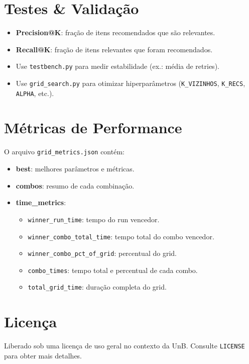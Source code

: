 \documentclass[a4paper,12pt]{article}
\begin{document}
\section*{Testes \& Validação}
\begin{itemize}
  \item \textbf{Precision@K}: fração de itens recomendados que são relevantes.
  \item \textbf{Recall@K}: fração de itens relevantes que foram recomendados.
  \item Use \texttt{testbench.py} para medir estabilidade (ex.: média de retries).
  \item Use \texttt{grid\_search.py} para otimizar hiperparâmetros (\texttt{K\_VIZINHOS}, \texttt{K\_RECS}, \texttt{ALPHA}, etc.).
\end{itemize}

\section*{Métricas de Performance}
O arquivo \texttt{grid\_metrics.json} contém:
\begin{itemize}
  \item \textbf{best}: melhores parâmetros e métricas.
  \item \textbf{combos}: resumo de cada combinação.
  \item \textbf{time\_metrics}: 
    \begin{itemize}
      \item \texttt{winner\_run\_time}: tempo do run vencedor.
      \item \texttt{winner\_combo\_total\_time}: tempo total do combo vencedor.
      \item \texttt{winner\_combo\_pct\_of\_grid}: percentual do grid.
      \item \texttt{combo\_times}: tempo total e percentual de cada combo.
      \item \texttt{total\_grid\_time}: duração completa do grid.
    \end{itemize}
\end{itemize}

\section*{Licença}
Liberado sob uma licença de uso geral no contexto da UnB. \newline Consulte \texttt{LICENSE} para obter mais detalhes.
\end{document}
